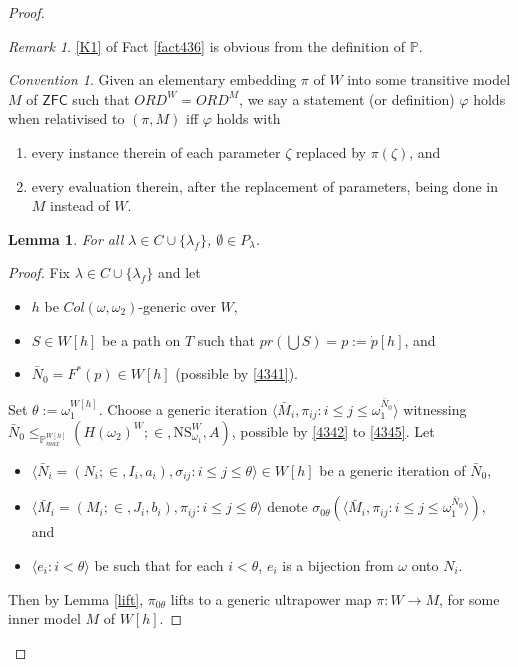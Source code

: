 \documentclass[12pt, twoside]{memoir}
\numberwithin{equation}{section}
\newtheorem{lem}[thm]{Lemma}
\theoremstyle{definition}
\theoremstyle{remark}
\newtheorem{rem}[thm]{Remark}
\newtheorem{con}[thm]{Convention}
\theoremstyle{definition}
\theoremstyle{definition}
\theoremstyle{definition}
\theoremstyle{remark}
\begin{document}
\begin{proof}
\begin{rem}\label{rem447}
\ref{K1} of Fact \ref{fact436} is obvious from the definition of $\mathbb{P}$.
\end{rem}

\begin{con}
Given an elementary embedding $\pi$ of $W$ into some transitive model $M$ of $\mathsf{ZFC}$ such that $ORD^W = ORD^M$, we say a statement (or definition) $\varphi$ holds when relativised to $(\pi, M)$ iff $\varphi$ holds with
\begin{enumerate}[label=(\alph*)]
    \item every instance therein of each parameter $\zeta$ replaced by $\pi(\zeta)$, and
    \item every evaluation therein, after the replacement of parameters, being done in $M$ instead of $W$.
\end{enumerate}
\end{con}

\begin{lem}\label{nonemp2}
For all $\lambda \in C \cup \{\lambda_f\}$, $\emptyset \in P_{\lambda}$.
\end{lem}

\begin{proof}
Fix $\lambda \in C \cup \{\lambda_f\}$ and let 
\begin{itemize}
    \item $h$ be $Col(\omega, \omega_2)$-generic over $W$,
    \item $S \in W[h]$ be a path on $T$ such that $pr(\bigcup S) = p := \dot{p}[h]$, and
    \item $\bar{N}_0 = F^*(p) \in W[h]$ (possible by \ref{4341}).
\end{itemize}
Set $\theta := \omega_1^{W[h]}$. Choose a generic iteration $\langle \bar{M}_i, \pi_{ij} : i \leq j \leq \omega_1^{\bar{N}_0} \rangle$ witnessing $\bar{N}_0 \leq_{\mathbb{P}^{W[h]}_{max}} (H(\omega_2)^W; \in, \mathrm{NS}_{\omega_1}^W, A)$, possible by \ref{4342} to \ref{4345}. Let 
\begin{itemize}
    \item $\langle \bar{N}_i = (N_i; \in, I_i, a_i), \sigma_{ij} : i \leq j \leq \theta \rangle \in W[h]$ be a generic iteration of $\bar{N}_0$,
    \item $\langle \bar{M}_i = (M_i; \in, J_i, b_i), \pi_{ij} : i \leq j \leq \theta \rangle$ denote $\sigma_{0\theta}(\langle \bar{M}_i, \pi_{ij} : i \leq j \leq \omega_1^{\bar{N}_0} \rangle)$, and
    \item $\langle e_i : i < \theta \rangle$ be such that for each $i < \theta$, $e_i$ is a bijection from $\omega$ onto $N_i$.
\end{itemize}
Then by Lemma \ref{lift}, $\pi_{0\theta}$ lifts to a generic ultrapower map $\pi : W \longrightarrow M$, for some inner model $M$ of $W[h]$. 


\end{proof}
\end{proof}
\end{document}
